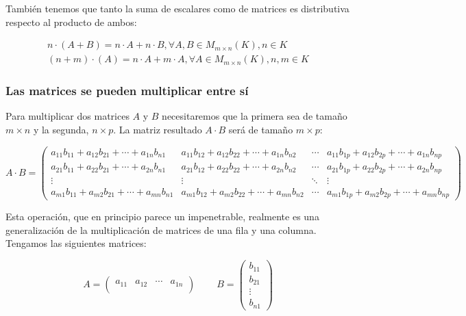 También tenemos que tanto la suma de escalares como de matrices es distributiva respecto al producto de ambos:

\[
	\begin{array}{c}
		n \cdot (A+B) = n \cdot A + n \cdot B, \forall A,B \in M_{m \times n}(K), n \in K \\
		(n+m) \cdot (A) = n \cdot A + m \cdot A, \forall A \in M_{m \times n}(K), n,m \in K
	\end{array}
\]

\subsubsection{Las matrices se pueden multiplicar entre sí}

Para multiplicar dos matrices $A$ y $B$ necesitaremos que la primera sea de tamaño $m \times n$ y la segunda, $n \times p$.
La matriz resultado $A \cdot B$ será de tamaño $m \times p$:

\[
	A \cdot B =
	\begin{pmatrix}
		a_{11}b_{11}+a_{12}b_{21}+\cdots+a_{1n}b_{n1} & a_{11}b_{12}+a_{12}b_{22}+\cdots+a_{1n}b_{n2} & \cdots & a_{11}b_{1p}+a_{12}b_{2p}+\cdots+a_{1n}b_{np} \\
		a_{21}b_{11}+a_{22}b_{21}+\cdots+a_{2n}b_{n1} & a_{21}b_{12}+a_{22}b_{22}+\cdots+a_{2n}b_{n2} & \cdots & a_{21}b_{1p}+a_{22}b_{2p}+\cdots+a_{2n}b_{np} \\
		\vdots                                        & \vdots                                        & \ddots & \vdots                                        \\
		a_{m1}b_{11}+a_{m2}b_{21}+\cdots+a_{mn}b_{n1} & a_{m1}b_{12}+a_{m2}b_{22}+\cdots+a_{mn}b_{n2} & \cdots & a_{m1}b_{1p}+a_{m2}b_{2p}+\cdots+a_{mn}b_{np}
	\end{pmatrix}
\]

Esta operación, que en principio parece un impenetrable, realmente es una generalización de la multiplicación de matrices de una fila y una columna.
Tengamos las siguientes matrices:

\[
	A =
	\begin{pmatrix}
		a_{11} & a_{12} & \cdots & a_{1n} \\
	\end{pmatrix}
	\ \ \ \ \ \ \ \ \ \ B =
	\begin{pmatrix}
		b_{11} \\
		b_{21} \\
		\vdots \\
		b_{n1}
	\end{pmatrix}
\]

